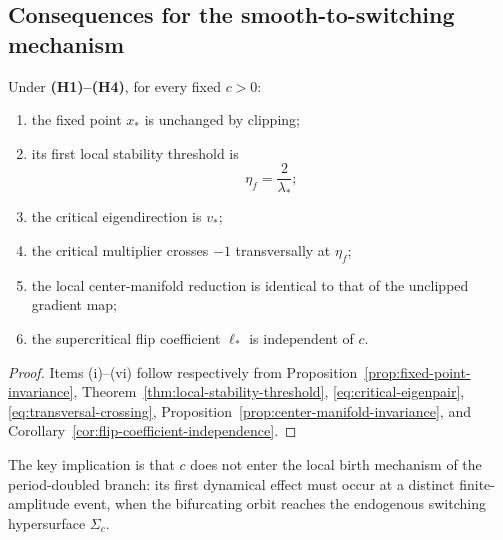 \subsection{Consequences for the smooth-to-switching mechanism}
\label{subsec:local-structure-consequences}

\begin{corollary}
\label{cor:local-bifurcation-clipping-independent}
Under \textbf{(H1)--(H4)}, for every fixed $c>0$:

\begin{enumerate}[label=\textnormal{(\roman*)}]

\item
the fixed point $x_*$ is unchanged by clipping;

\item
its first local stability threshold is
\[
\eta_f=\frac{2}{\lambda_*};
\]

\item
the critical eigendirection is $v_*$;

\item
the critical multiplier crosses $-1$ transversally at $\eta_f$;

\item
the local center-manifold reduction is identical to that of the
unclipped gradient map;

\item
the supercritical flip coefficient $\ell_*$ is independent of $c$.

\end{enumerate}
\end{corollary}

\begin{proof}
Items (i)--(vi) follow respectively from
Proposition~\ref{prop:fixed-point-invariance},
Theorem~\ref{thm:local-stability-threshold},
\eqref{eq:critical-eigenpair},
\eqref{eq:transversal-crossing},
Proposition~\ref{prop:center-manifold-invariance}, and
Corollary~\ref{cor:flip-coefficient-independence}.
\end{proof}

The key implication is that $c$ does not enter the local birth
mechanism of the period-doubled branch: its first dynamical effect
must occur at a distinct finite-amplitude event, when the
bifurcating orbit reaches the endogenous switching hypersurface
$\Sigma_c$.

